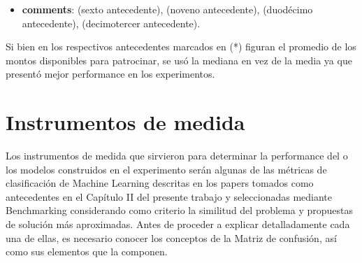 \begin{itemize}
	\item \textbf{comments}: \citeauthor{pr_li2016predcrowd} (sexto antecedente), \citeauthor{pr_kaur2017socmedcrowd} (noveno antecedente), \citeauthor{pr_lee2018contentDL} (duodécimo antecedente), \citeauthor{pr_jin2019dayssuccess} (decimotercer antecedente).
\end{itemize}

Si bien en los respectivos antecedentes marcados en (*) figuran el promedio de los montos disponibles para patrocinar, se usó la mediana en vez de la media ya que presentó mejor performance en los experimentos.

\section{Instrumentos de medida}
Los instrumentos de medida que sirvieron para determinar la performance del o los modelos construidos en el experimento serán algunas de las métricas de clasificación de Machine Learning descritas en los papers tomados como antecedentes en el Capítulo II del presente trabajo y seleccionadas mediante Benchmarking considerando como criterio la similitud del problema y propuestas de solución más aproximadas. Antes de proceder a explicar detalladamente cada una de ellas, es necesario conocer los conceptos de la Matriz de confusión, así como sus elementos que la componen.

